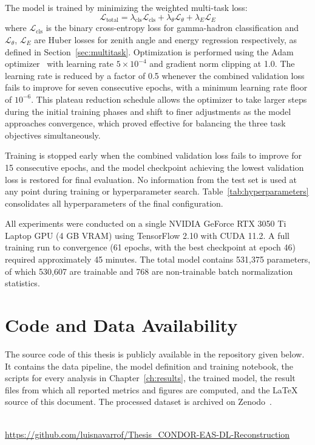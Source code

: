 The model is trained by minimizing the weighted multi-task loss:
\begin{equation}
    \mathcal{L}_\text{total} = \lambda_\text{cls} \mathcal{L}_\text{cls} + \lambda_\theta \mathcal{L}_\theta + \lambda_E \mathcal{L}_E
\end{equation}
where $\mathcal{L}_\text{cls}$ is the binary cross-entropy loss for gamma-hadron classification and $\mathcal{L}_\theta$, $\mathcal{L}_E$ are Huber losses for zenith angle and energy regression respectively, as defined in Section~\ref{sec:multitask}. Optimization is performed using the Adam optimizer~ with learning rate $5 \times 10^{-4}$ and gradient norm clipping at 1.0. The learning rate is reduced by a factor of 0.5 whenever the combined validation loss fails to improve for seven consecutive epochs, with a minimum learning rate floor of $10^{-6}$. This plateau reduction schedule allows the optimizer to take larger steps during the initial training phases and shift to finer adjustments as the model approaches convergence, which proved effective for balancing the three task objectives simultaneously.

Training is stopped early when the combined validation loss fails to improve for 15 consecutive epochs, and the model checkpoint achieving the lowest validation loss is restored for final evaluation. No information from the test set is used at any point during training or hyperparameter search. Table~\ref{tab:hyperparameters} consolidates all hyperparameters of the final configuration.

All experiments were conducted on a single NVIDIA GeForce RTX 3050 Ti Laptop GPU (4 GB VRAM) using TensorFlow 2.10 with CUDA 11.2. A full training run to convergence (61 epochs, with the best checkpoint at epoch 46) required approximately 45 minutes. The total model contains 531,375 parameters, of which 530,607 are trainable and 768 are non-trainable batch normalization statistics.

\section{Code and Data Availability}
\label{sec:code_availability}

The source code of this thesis is publicly available in the repository given below. It contains the data pipeline, the model definition and training notebook, the scripts for every analysis in Chapter~\ref{ch:results}, the trained model, the result files from which all reported metrics and figures are computed, and the \LaTeX{} source of this document. The processed dataset is archived on Zenodo~\cite{navarro2025dataset}.

\begin{center}
    \href{https://github.com/luisnavarrof/Thesis_CONDOR-EAS-DL-Reconstruction}{}\\[0.6em]
    {\small\url{https://github.com/luisnavarrof/Thesis_CONDOR-EAS-DL-Reconstruction}}
\end{center}
